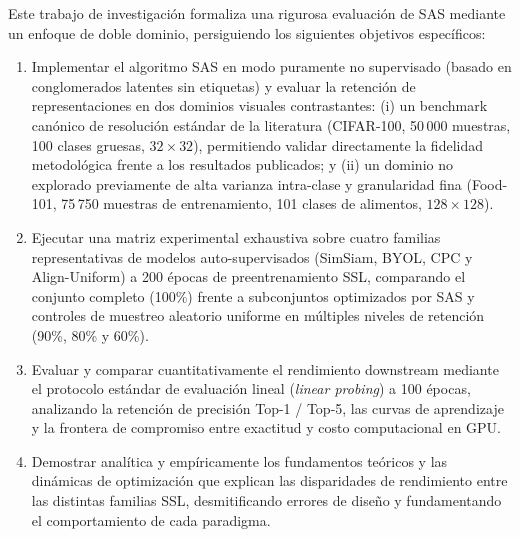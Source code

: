 Este trabajo de investigación formaliza una rigurosa evaluación de SAS mediante un enfoque de doble dominio, persiguiendo los siguientes objetivos específicos:
\begin{enumerate}
    \item Implementar el algoritmo SAS en modo puramente no supervisado (basado en conglomerados latentes sin etiquetas) y evaluar la retención de representaciones en dos dominios visuales contrastantes: (i) un benchmark canónico de resolución estándar de la literatura (CIFAR-100, 50\,000 muestras, 100 clases gruesas, $32 \times 32$), permitiendo validar directamente la fidelidad metodológica frente a los resultados publicados; y (ii) un dominio no explorado previamente de alta varianza intra-clase y granularidad fina (Food-101, 75\,750 muestras de entrenamiento, 101 clases de alimentos, $128 \times 128$).
    \item Ejecutar una matriz experimental exhaustiva sobre cuatro familias representativas de modelos auto-supervisados (SimSiam, BYOL, CPC y Align-Uniform) a 200 épocas de preentrenamiento SSL, comparando el conjunto completo (100\%) frente a subconjuntos optimizados por SAS y controles de muestreo aleatorio uniforme en múltiples niveles de retención (90\%, 80\% y 60\%).
    \item Evaluar y comparar cuantitativamente el rendimiento downstream mediante el protocolo estándar de evaluación lineal (\textit{linear probing}) a 100 épocas, analizando la retención de precisión Top-1 / Top-5, las curvas de aprendizaje y la frontera de compromiso entre exactitud y costo computacional en GPU.
    \item Demostrar analítica y empíricamente los fundamentos teóricos y las dinámicas de optimización que explican las disparidades de rendimiento entre las distintas familias SSL, desmitificando errores de diseño y fundamentando el comportamiento de cada paradigma.
\end{enumerate}

